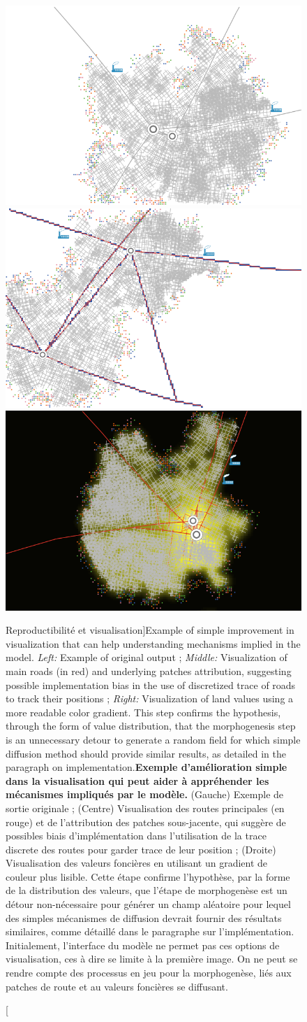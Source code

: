 \begin{figure}
\includegraphics[width=0.3\linewidth]{Figures/Reproducibility/stdView}
\includegraphics[width=0.3\linewidth]{Figures/Reproducibility/ViewRoads}
\includegraphics[width=0.3\linewidth]{Figures/Reproducibility/landValues_cityFinished}

\caption[Reproducibility and visualization][Reproductibilité et visualisation]{Example of simple improvement in visualization that can help understanding mechanisms implied in the model. \textit{Left: } Example of original output ; \textit{Middle: } Visualization of main roads (in red) and underlying patches attribution, suggesting possible implementation bias in the use of discretized trace of roads to track their positions ; \textit{Right: }Visualization of land values using a more readable color gradient. This step confirms the hypothesis, through the form of value distribution, that the morphogenesis step is an unnecessary detour to generate a random field for which simple diffusion method should provide similar results, as detailed in the paragraph on implementation.\label{fig:example_tij_viz}}{\textbf{Exemple d'amélioration simple dans la visualisation qui peut aider à appréhender les mécanismes impliqués par le modèle.} (Gauche) Exemple de sortie originale ; (Centre) Visualisation des routes principales (en rouge) et de l'attribution des patches sous-jacente, qui suggère de possibles biais d'implémentation dans l'utilisation de la trace discrete des routes pour garder trace de leur position ; (Droite) Visualisation des valeurs foncières en utilisant un gradient de couleur plus lisible. Cette étape confirme l'hypothèse, par la forme de la distribution des valeurs, que l'étape de morphogenèse est un détour non-nécessaire pour générer un champ aléatoire pour lequel des simples mécanismes de diffusion devrait fournir des résultats similaires, comme détaillé dans le paragraphe sur l'implémentation. Initialement, l'interface du modèle ne permet pas ces options de visualisation, ces à dire se limite à la première image. On ne peut se rendre compte des processus en jeu pour la morphogenèse, liés aux patches de route et au valeurs foncières se diffusant.\label{fig:reproducibility:example_tij_viz}}
\end{figure}



